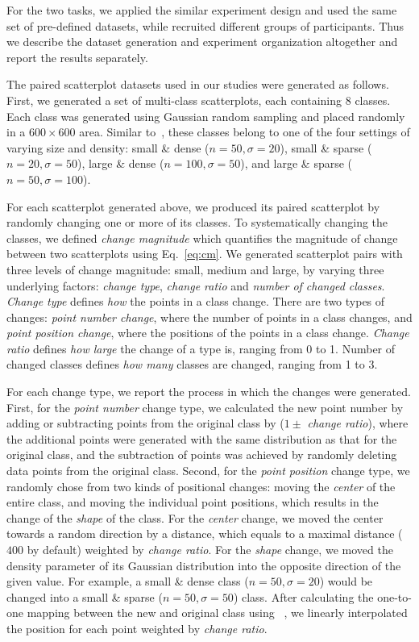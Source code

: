 {For the two tasks, we applied the similar experiment design and used the same set of pre-defined datasets, while recruited different groups of participants. Thus we describe the dataset generation and experiment organization altogether and report the results separately.


\vspace{.3em}
The paired scatterplot datasets used in our studies were generated as follows.
First, we generated a set of multi-class scatterplots, each containing $8$ classes. Each class was generated using Gaussian random sampling and placed randomly in a $600 \times 600$ area.
Similar to~\cite{Lu21}, these classes belong to one of the four settings of varying size and density: small \& dense ($n=50, \sigma=20$), small \& sparse ($n=20, \sigma=50$),  large \& dense ($n=100, \sigma=50$), and large \& sparse ($n=50, \sigma=100$).

For each scatterplot generated above, we produced its paired scatterplot by randomly changing one or more of its classes.
To systematically changing the classes, we defined \emph{change magnitude} which quantifies the magnitude of change between two scatterplots using Eq.~\ref{eq:cm}. We generated scatterplot pairs with three levels of change magnitude: small, medium and large, by varying three underlying factors: \emph{change type}, \emph{change ratio} and \emph{number of changed classes}.
\emph{Change type} defines \emph{how} the points in a class change. There are two types of changes: \emph{point number change}, where the number of points in a class changes, and \emph{point position change}, where the positions of the points in a class change.
\emph{Change ratio} defines \emph{how large} the change of a type is, ranging from 0 to 1. {Number of changed classes} defines \emph{how many} classes are changed, ranging from 1 to 3.

For each change type, we report the process in which the changes were generated.
First, for the \emph{point number} change type, we calculated the new point number by adding or subtracting points from the original class by ($1 \pm$ \emph{change ratio}), where the additional points were generated with the same distribution as that for the original class, and the subtraction of points was achieved by randomly deleting data points from the original class.
Second, for the \emph{point position} change type, we randomly chose from two kinds of positional changes: moving the \emph{center} of the entire class, and moving the individual point positions, which results in the change of the \emph{shape} of the class. For the \emph{center} change, we moved the center towards a random direction by a distance, which equals to a maximal distance ($400$ by default) weighted by \emph{change ratio}. For the \emph{shape} change, we moved the density parameter of its Gaussian distribution into the opposite direction of the given value. For example, a small \& dense class ($n=50, \sigma=20$) would be changed into a small \& sparse ($n=50, \sigma=50$) class. After calculating the one-to-one mapping between the new and original class using ~\cite{kuhn1955hungarian}, we linearly interpolated the position for each point weighted by \emph{change ratio}.

}
